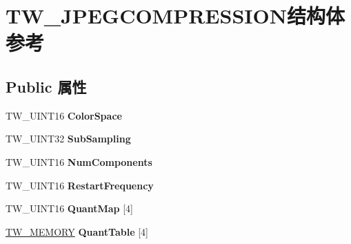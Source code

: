 \hypertarget{struct_t_w___j_p_e_g_c_o_m_p_r_e_s_s_i_o_n}{}\section{T\+W\+\_\+\+J\+P\+E\+G\+C\+O\+M\+P\+R\+E\+S\+S\+I\+O\+N结构体 参考}
\label{struct_t_w___j_p_e_g_c_o_m_p_r_e_s_s_i_o_n}
\subsection*{Public 属性}
\begin{DoxyCompactItemize}
\item 
\mbox{\label{struct_t_w___j_p_e_g_c_o_m_p_r_e_s_s_i_o_n_a9841a4641c831211bd40979cfc6246a6}} 
T\+W\+\_\+\+U\+I\+N\+T16 {\bfseries Color\+Space}
\item 
\mbox{\label{struct_t_w___j_p_e_g_c_o_m_p_r_e_s_s_i_o_n_a9b13b37591724f92eb6f4964468834c7}} 
T\+W\+\_\+\+U\+I\+N\+T32 {\bfseries Sub\+Sampling}
\item 
\mbox{\label{struct_t_w___j_p_e_g_c_o_m_p_r_e_s_s_i_o_n_abb70dc5c45ed428e745dddaed4c52cc1}} 
T\+W\+\_\+\+U\+I\+N\+T16 {\bfseries Num\+Components}
\item 
\mbox{\label{struct_t_w___j_p_e_g_c_o_m_p_r_e_s_s_i_o_n_a7b1b3ef2a277145aedc7f20f317a05ba}} 
T\+W\+\_\+\+U\+I\+N\+T16 {\bfseries Restart\+Frequency}
\item 
\mbox{\label{struct_t_w___j_p_e_g_c_o_m_p_r_e_s_s_i_o_n_a30c5dd03d5343bba25c22a11c7b9fe92}} 
T\+W\+\_\+\+U\+I\+N\+T16 {\bfseries Quant\+Map} \mbox{[}4\mbox{]}
\item 
\mbox{\label{struct_t_w___j_p_e_g_c_o_m_p_r_e_s_s_i_o_n_aa200f015e3889bd215bc1cce01e2b60d}} 
\hyperlink{struct_t_w___m_e_m_o_r_y}{T\+W\+\_\+\+M\+E\+M\+O\+RY} {\bfseries Quant\+Table} \mbox{[}4\mbox{]}
\item 
\mbox{\label{struct_t_w___j_p_e_g_c_o_m_p_r_e_s_s_i_o_n_ac7ef6781c970eb7d28b668d3ac464546}} 

\end{DoxyCompactItemize}
